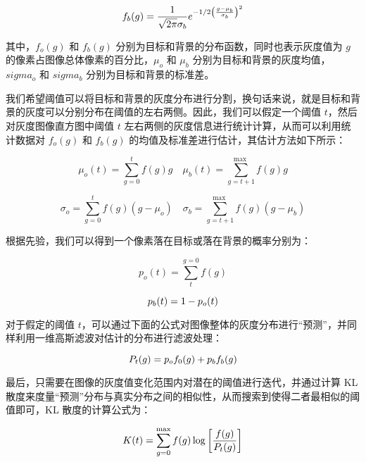 \begin{equation}
f_b(g)=\frac{1}{\sqrt{2 \pi} \sigma_b} e^{-1 / 2\left(\frac{g-\mu_b}{\sigma_b}\right)^2}
\vspace{0.5cm}
\end{equation}

其中，$f_o(g)$ 和 $f_b(g)$ 分别为目标和背景的分布函数，同时也表示灰度值为 $g$ 的像素占图像总体像素的百分比，$\mu_o$ 和 $\mu_b$ 分别为目标和背景的灰度均值，$sigma_o$ 和 $sigma_b$ 分别为目标和背景的标准差。

我们希望阈值可以将目标和背景的灰度分布进行分割，换句话来说，就是目标和背景的灰度可以分别分布在阈值的左右两侧。因此，我们可以假定一个阈值 $t$，然后对灰度图像直方图中阈值 $t$ 左右两侧的灰度信息进行统计计算，从而可以利用统计数据对 $f_o(g)$ 和 $f_b(g)$ 的均值及标准差进行估计，其估计方法如下所示：

\begin{equation}
\mu_o(t)=\sum_{g=0}^t f(g) g \quad \mu_b(t)=\sum_{g=t+1}^{\text {max }} f(g) g
\end{equation}

\begin{equation}
\sigma_o=\sum_{g=0}^t f(g) \left(g-\mu_o\right)  \quad \sigma_b=\sum_{g=t+1}^{\text {max }} f(g) \left(g-\mu_b\right)
\end{equation}

根据先验，我们可以得到一个像素落在目标或落在背景的概率分别为：

\begin{equation}
p_o(t)=\sum_t^{g=0} f(g)
\end{equation}

\begin{equation}
p_b(t)=1-p_o(t)
\vspace{0.5cm}
\end{equation}

对于假定的阈值 $t$，可以通过下面的公式对图像整体的灰度分布进行“预测”，并同样利用一维高斯滤波对估计的分布进行滤波处理：

\begin{equation}
P_t(g)=p_o f_0(g)+p_b f_b(g)
\vspace{0.5cm}
\end{equation}

最后，只需要在图像的灰度值变化范围内对潜在的阈值进行迭代，并通过计算 KL 散度来度量“预测”分布与真实分布之间的相似性，从而搜索到使得二者最相似的阈值即可，KL 散度的计算公式为：

\begin{equation}
K(t)=\sum_{g=0}^{\max } f(g) \log \left[\frac{f(g)}{P_t(g)}\right]
\vspace{0.5cm}
\end{equation}

